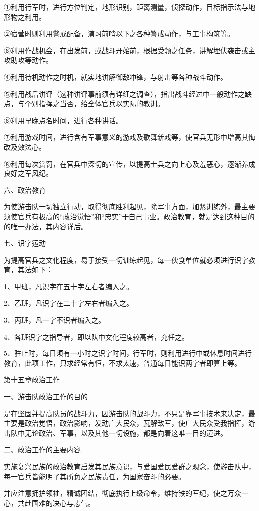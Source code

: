 ①利用行军时，进行方位判定，地形识别，距离测量，侦探动作，目标指示法与地形物之利用。

②宿营时则利用警戒配备，演习前哨以下之各种警戒动作，与工事构筑等。

⑧利用作战机会，在出发前，或战斗开始前，根据受领之任务，讲解埋伏袭击或主攻助攻等动作。

④利用待机动作之时机，就实地讲解御敌冲锋，与射击等各种战斗动作。

⑤利用战后讲评（这种讲评事前须有详细之调查），指出战斗经过中一般动作之缺点，与个别指挥之当否，给全体官兵以实际的教训。

⑧利用早晚点名时间，进行各种讲话。

⑦利用游戏时间，进行含有军事意义的游戏及歌舞新戏等，使官兵无形中增高其悔改及效法心。

⑧利用每次赏罚，在官兵中深切的宣传，以提高士兵之向上心及羞恶心，逐渐养成良好之军风纪。

六、政治教育

为使游击队一切独立行动，取得彻底胜利起见，除军事方面，加紧训练外，最主要须使官兵有极高的“政治觉悟”和“忠实”于自己事业。政治教育，就是达到这种目的的唯一办法，其内容详后。

七、识字运动

为提高官兵之文化程度，易于接受一切训练起见，每一伙食单位就必须进行识字教育，其法如下：

1、甲班，凡识字在五十字左右者编入之。

2、乙班，凡识字在二十字左右者编入之。

3、丙班，凡一字不识者编入之。

4、各班识字之指导者，即以队中文化程度较高者，充任之。

5、驻止时，每日须有一小时之识字时间，行军时，则利用进行中或休息时间进行教育，此项工作，只求经常有恒，不求太速，普通每日能识两字者即算上等。

第十五章政治工作

一、游击队政治工作的目的

是在坚固并提高队员的战斗力，因游击队的战斗力，不只是靠军事技术来决定，最主要是政治觉悟，政治影响，发动广大民众，瓦解敌军，使广大民众受我指挥，游击队中无论政治、军事，以及其他一切设施，都是向着这唯一目的迈进。

二、政治工作的主要内容

实施复兴民族的政治教育启发其民族意识，与爱国爱民爱群之观念，使游击队中，每一官兵皆能明了其所负之民族责任，为国家奋斗的必要。

并应注意拥护领袖，精诚团结，彻底执行上级命令，维持铁的军纪，使之万众一心，共赴国难的决心与志气。

